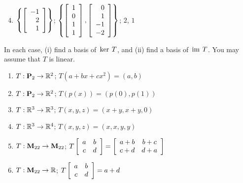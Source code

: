 \begin{multicols}{2}
\begin{ex}
\begin{sol}
\begin{enumerate}[label={\alph*.}]
\setcounter{enumi}{3}
\item $\left\lbrace \left[ \begin{array}{r}
-1 \\
2 \\
1 
\end{array} \right] \right\rbrace$; 
$\left\lbrace \left[ \begin{array}{r}
1 \\
0 \\
1 \\
1 
\end{array} \right], \left[ \begin{array}{r}
0 \\
1 \\
-1 \\
-2
\end{array} \right] \right\rbrace$; $2$, $1$

\end{enumerate}
\end{sol}
\end{ex}

\begin{ex}
In each case, (i) find a basis of $\thinspace\operatorname{ker \medspace}T$, and (ii) find a basis of $\thinspace\operatorname{im \medspace}T$. You may assume that $T$ is linear.


\begin{enumerate}[label={\alph*.}]
\item $T : \textbf{P}_{2} \to \mathbb{R}^2$; $T(a + bx + cx^{2}) = (a, b)$

\item $T : \textbf{P}_{2} \to \mathbb{R}^2$; $T(p(x)) = (p(0), p(1))$

\item $T : \mathbb{R}^3 \to \mathbb{R}^3$; $T(x, y, z) = (x + y, x + y, 0)$

\item $T : \mathbb{R}^3 \to \mathbb{R}^4$; $T(x, y, z) = (x, x, y, y)$

\item $T : \textbf{M}_{22} \to \textbf{M}_{22}$; $T\left[ \begin{array}{cc}
a & b \\
c & d
\end{array} \right] = \left[ \begin{array}{cc}
a + b & b + c \\
c + d & d + a
\end{array} \right]$

\item $T : \textbf{M}_{22} \to \mathbb{R}$; $T\left[ \begin{array}{cc}
a & b \\
c & d
\end{array} \right] = a + d$


\end{enumerate}
\end{ex}
\end{multicols}
